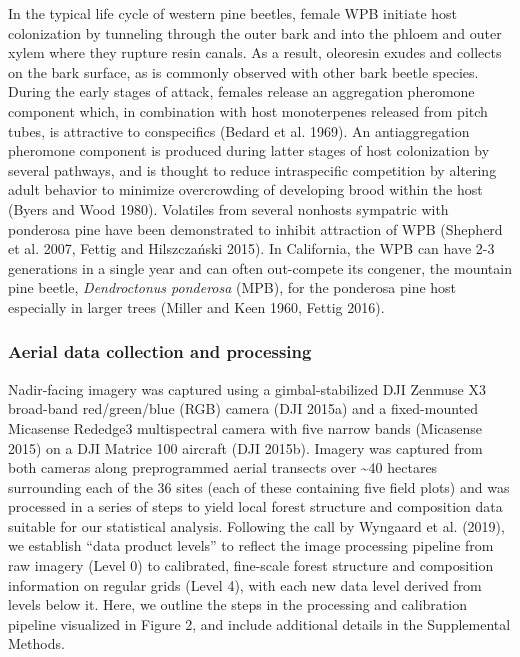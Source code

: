 \documentclass[]{article}
\begin{document}
In the typical life cycle of western pine beetles, female WPB initiate
host colonization by tunneling through the outer bark and into the
phloem and outer xylem where they rupture resin canals. As a result,
oleoresin exudes and collects on the bark surface, as is commonly
observed with other bark beetle species. During the early stages of
attack, females release an aggregation pheromone component which, in
combination with host monoterpenes released from pitch tubes, is
attractive to conspecifics (Bedard et al. 1969). An antiaggregation
pheromone component is produced during latter stages of host
colonization by several pathways, and is thought to reduce intraspecific
competition by altering adult behavior to minimize overcrowding of
developing brood within the host (Byers and Wood 1980). Volatiles from
several nonhosts sympatric with ponderosa pine have been demonstrated to
inhibit attraction of WPB (Shepherd et al. 2007, Fettig and Hilszczański
2015). In California, the WPB can have 2-3 generations in a single year
and can often out-compete its congener, the mountain pine beetle,
\emph{Dendroctonus ponderosa} (MPB), for the ponderosa pine host
especially in larger trees (Miller and Keen 1960, Fettig 2016).

\hypertarget{aerial-data-collection-and-processing}{%
\subsubsection{Aerial data collection and
processing}\label{aerial-data-collection-and-processing}}

Nadir-facing imagery was captured using a gimbal-stabilized DJI Zenmuse
X3 broad-band red/green/blue (RGB) camera (DJI 2015a) and a
fixed-mounted Micasense Rededge3 multispectral camera with five narrow
bands (Micasense 2015) on a DJI Matrice 100 aircraft (DJI 2015b).
Imagery was captured from both cameras along preprogrammed aerial
transects over \textasciitilde{}40 hectares surrounding each of the 36
sites (each of these containing five field plots) and was processed in a
series of steps to yield local forest structure and composition data
suitable for our statistical analysis. Following the call by Wyngaard et
al. (2019), we establish ``data product levels'' to reflect the image
processing pipeline from raw imagery (Level 0) to calibrated, fine-scale
forest structure and composition information on regular grids (Level 4),
with each new data level derived from levels below it. Here, we outline
the steps in the processing and calibration pipeline visualized in
Figure 2, and include additional details in the Supplemental Methods.
\end{document}
